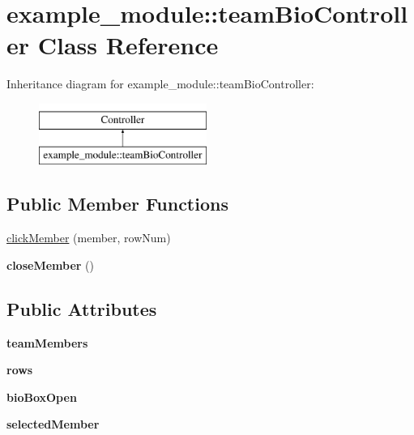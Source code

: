 \hypertarget{classexample__module_1_1teamBioController}{\section{example\-\_\-module\-:\-:team\-Bio\-Controller Class Reference}
\label{classexample__module_1_1teamBioController}
}
Inheritance diagram for example\-\_\-module\-:\-:team\-Bio\-Controller\-:\begin{figure}[H]
\begin{center}
\leavevmode
\includegraphics[height=2.000000cm]{classexample__module_1_1teamBioController}
\end{center}
\end{figure}
\subsection*{Public Member Functions}
\begin{DoxyCompactItemize}
\item 
\hyperlink{classexample__module_1_1teamBioController_aba8ada26a0e5bb27d75006d27d60bb0d}{click\-Member} (member, row\-Num)
\item 
\hypertarget{classexample__module_1_1teamBioController_af582ac7a4395735de32041309f1555a9}{{\bfseries close\-Member} ()}\label{classexample__module_1_1teamBioController_af582ac7a4395735de32041309f1555a9}

\end{DoxyCompactItemize}
\subsection*{Public Attributes}
\begin{DoxyCompactItemize}
\item 
\hypertarget{classexample__module_1_1teamBioController_aa83d355d008ed4cbffe0dd42af5d7340}{{\bfseries team\-Members}}\label{classexample__module_1_1teamBioController_aa83d355d008ed4cbffe0dd42af5d7340}

\item 
\hypertarget{classexample__module_1_1teamBioController_aba1e7291bd6e62aa8814832f6fcc944e}{{\bfseries rows}}\label{classexample__module_1_1teamBioController_aba1e7291bd6e62aa8814832f6fcc944e}

\item 
\hypertarget{classexample__module_1_1teamBioController_ad1fb6aa096ca17f3c9ccff69bfea631b}{{\bfseries bio\-Box\-Open}}\label{classexample__module_1_1teamBioController_ad1fb6aa096ca17f3c9ccff69bfea631b}

\item 
\hypertarget{classexample__module_1_1teamBioController_aff8d96f3b12284135ba8ed477a5f4fc0}{{\bfseries selected\-Member}}\label{classexample__module_1_1teamBioController_aff8d96f3b12284135ba8ed477a5f4fc0}

\end{DoxyCompactItemize}


